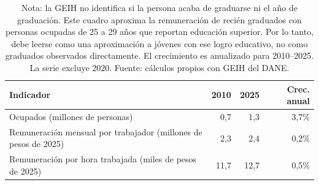 \begin{table}[H]
\centering
\caption{Remuneración laboral de ocupados de 25 a 29 años con educación superior, 2010 y 2025}
\label{tab:remuneracion_recien_graduados}
\footnotesize
\begin{tabular}{@{}p{6.6cm}rrr@{}}
\toprule
Indicador & 2010 & 2025 & Crec. anual \\
\midrule
Ocupados (millones de personas) & 0,7 & 1,3 & 3,7\% \\
Remuneración mensual por trabajador (millones de pesos de 2025) & 2,3 & 2,4 & 0,2\% \\
Remuneración por hora trabajada (miles de pesos de 2025) & 11,7 & 12,7 & 0,5\% \\
\bottomrule
\end{tabular}
\caption*{\footnotesize Nota: la GEIH no identifica si la persona acaba de graduarse ni el año de graduación. Este cuadro aproxima la remuneración de recién graduados con personas ocupadas de 25 a 29 años que reportan educación superior. Por lo tanto, debe leerse como una aproximación a jóvenes con ese logro educativo, no como graduados observados directamente. El crecimiento es anualizado para 2010--2025. La serie excluye 2020. Fuente: cálculos propios con GEIH del DANE.}
\end{table}
